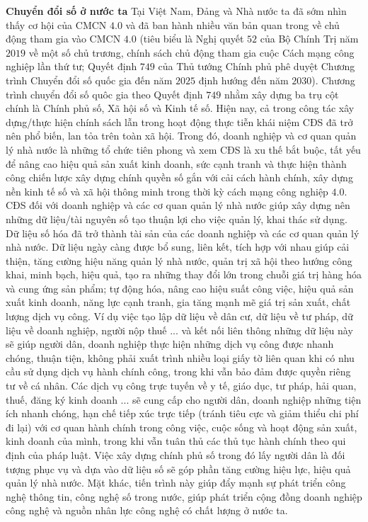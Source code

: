 \begin{multicols}{2}
	\vskip 0.1cm
	\textbf{\color{toanhocdoisong}Chuyển đổi số ở nước ta}
	\vskip 0.1cm
	Tại Việt Nam, Đảng và Nhà nước ta đã sớm nhìn thấy cơ hội của CMCN $4{.}0$ và đã ban hành nhiều văn bản quan trong về chủ động tham gia vào CMCN $4{.}0$ (tiêu biểu là Nghị quyết $52$ của Bộ Chính Trị năm $2019$ về một số chủ trương, chính sách chủ động tham gia cuộc Cách mạng công  nghiệp lần thứ tư; Quyết định $749$ của Thủ tướng Chính phủ phê duyệt Chương trình Chuyển đổi số quốc gia đến năm $2025$ định hướng đến năm $2030$). Chương trình chuyển đổi số quôc gia theo Quyết định $749$ nhằm xây dựng ba trụ cột chính là Chính phủ số, Xã hội số và Kinh tế số.
	\vskip 0.1cm
	Hiện nay, cả trong công tác xây dựng/thực hiện chính sách lẫn trong hoạt động thực tiễn khái niệm CĐS đã trở nên phổ biến, lan tỏa trên toàn xã hội. Trong đó, doanh nghiệp và cơ quan quản lý nhà nước là những tổ chức tiên phong và xem CĐS là xu thế bắt buộc, tất yếu để nâng cao hiệu quả sản xuất kinh doanh, sức cạnh tranh và thực hiện thành công chiến lược xây dựng chính quyền số gắn với cải cách hành chính, xây dựng nền kinh tế số và xã hội thông minh trong thời kỳ cách mạng công nghiệp $4{.}0$.
	\vskip 0.1cm
	CĐS đối với doanh nghiệp và các cơ quan quản lý nhà nước giúp xây dựng nên những dữ liệu/tài nguyên số tạo thuận lợi cho việc quản lý, khai thác sử dụng. Dữ liệu số hóa đã trở thành tài sản của các doanh nghiệp và các cơ quan quản lý nhà nước. Dữ liệu ngày càng được bổ sung, liên kết, tích hợp với nhau giúp cải thiện, tăng cường hiệu năng quản lý nhà nước, quản trị xã hội theo hướng công khai, minh bạch, hiệu quả, tạo ra những thay đổi lớn trong chuỗi giá trị hàng hóa và cung ứng sản phẩm; tự động hóa, nâng cao hiệu suất công việc, hiệu quả sản xuất kinh doanh, năng lực cạnh tranh, gia tăng mạnh mẽ giá trị sản xuất, chất lượng dịch vụ công.
	\vskip 0.1cm
	Ví dụ việc tạo lập dữ liệu về dân cư, dữ liệu về tư pháp, dữ liệu về doanh nghiệp, người nộp thuế ... và kết nối liên thông những dữ liệu này sẽ giúp người dân, doanh nghiệp thực hiện những dịch vụ công được nhanh chóng, thuận tiện, không phải xuất trình nhiều loại giấy tờ liên quan khi có nhu cầu sử dụng dịch vụ hành chính công, trong khi vẫn bảo đảm được quyền riêng tư về cá nhân. Các dịch vụ công trực tuyến về y tế, giáo dục, tư pháp, hải quan, thuế, đăng ký kinh doanh ... sẽ cung cấp cho người dân, doanh nghiệp những tiện ích nhanh chóng, hạn chế tiếp xúc trực tiếp (tránh tiêu cực và giảm thiểu chi phí đi lại) với cơ quan hành chính trong công việc, cuộc sống và hoạt động sản xuất, kinh doanh của mình, trong khi vẫn tuân thủ các thủ tục hành chính theo qui định của pháp luật. Việc xây dựng chính phủ số trong đó lấy người dân là đối tượng phục vụ và dựa vào dữ liệu số sẽ góp phần tăng cường hiệu lực, hiệu quả quản lý nhà nước. Mặt khác, tiến trình này giúp đẩy mạnh sự phát triển công nghệ thông tin, công nghệ số trong nước, giúp phát triển cộng đồng doanh nghiệp công nghệ và nguồn nhân lực công nghệ có chất lượng ở nước ta.

\end{multicols}
